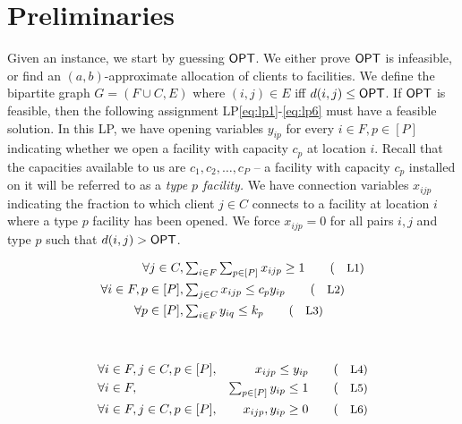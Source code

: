 \section{Preliminaries}\label{sec:prelims}
Given an \mckc instance, we start by guessing $\mathsf{OPT}$. We either prove $\mathsf{OPT}$ is infeasible, or find an $(a,b)$-approximate allocation of clients to facilities.
	We define the bipartite graph $G = (F\cup C,E)$ where $(i,j)\in E$ iff $d(i,j) \leq \mathsf{OPT}$. If $\mathsf{OPT}$ is feasible, then the following assignment LP\eqref{eq:lp1}-\eqref{eq:lp6}
	must have a feasible solution.
In this LP, we  have opening  variables $y_{ip}$ for every $i\in F,p\in [P]$ indicating whether we open a facility with capacity $c_p$ at location $i$. Recall that the capacities available to us are $c_1, c_2, \ldots, c_P$ -- a facility with
capacity $c_p$ installed on it will be referred to as a {\em type $p$ facility.}
	We have connection variables $x_{ijp}$ indicating the fraction to which client $j\in C$ connects to a facility at location $i$ where a type $p$ facility has been opened.
	We force $x_{ijp} = 0$ for all pairs $i,j$ and type $p$ such that  $d(i,j) > \mathsf{OPT}$.
	
		
		\begin{minipage}{0.49\textwidth}
			\begin{alignat*}{2}
				 \forall j\in C,   &\textstyle \sum_{i\in F} \sum_{p\in [P]}  x_{ijp} \geq 1 \label{eq:lp1} \tag{\small{L1}}  \\
				 \forall i\in F,p\in [P] ,  &\textstyle \sum_{j\in C}  x_{ijp} \leq c_py_{ip} \label{eq:lp2} \tag{\small{L2}} \\
				 \forall p\in [P], & \textstyle \sum_{i\in F} y_{iq}   \leq k_p \label{eq:lp3}  \tag{\small{L3}}
			\end{alignat*}
		\end{minipage}
		~\vline~
		\begin{minipage}{0.49\textwidth}
			\begin{alignat*}{3}
				&\forall i\in F, j\in C,p\in [P],  & x_{ijp} \leq y_{ip}\label{eq:lp4}   \tag{\small{L4}} \\
				& \forall i\in F, & \textstyle\sum_{p\in [P]} y_{ip} \leq 1 \label{eq:lp5}  \tag{\small{L5}} \\
				& \forall i\in F,j\in C,p\in [P], & x_{ijp},y_{ip} \geq 0\label{eq:lp6}\tag{\small{L6}}
			\end{alignat*}
		\end{minipage}
\smallskip

